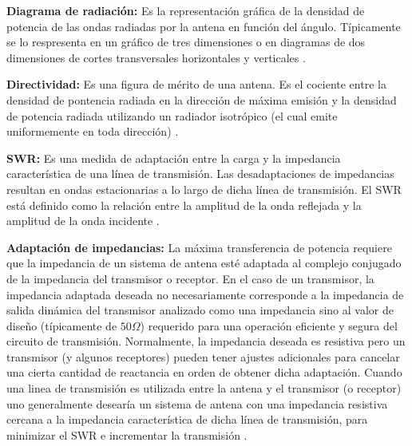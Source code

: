 {\textbf{Diagrama de radiación:}} Es la representación gráfica de la densidad de potencia de las ondas radiadas por la antena 
en función del ángulo. Típicamente se lo respresenta en un gráfico de tres dimensiones o en diagramas de dos dimensiones de 
cortes transversales horizontales y verticales \cite{AntennaWiki}.

{\textbf{Directividad:}} Es una figura de mérito de una antena. Es el cociente entre la densidad de pontencia radiada en la 
dirección de máxima emisión y la densidad de potencia radiada utilizando un radiador isotrópico (el cual emite uniformemente
en toda dirección) \cite{DirectivityWiki}.

{\textbf{SWR:}} Es una medida de adaptación entre la carga y la impedancia característica de una línea de transmisión. Las 
desadaptaciones de impedancias resultan en ondas estacionarias a lo largo de dicha línea de transmisión. El SWR está 
definido como la relación entre la amplitud de la onda reflejada y la amplitud de la onda incidente \cite{swrWiki}. 

{\textbf{Adaptación de impedancias:}} La máxima transferencia de potencia requiere que la impedancia de un sistema de 
antena esté adaptada al complejo conjugado de la impedancia del transmisor o receptor. En el caso de un transmisor, 
la impedancia adaptada deseada no necesariamente corresponde a la impedancia de salida dinámica del transmisor analizado
como una impedancia sino al valor de diseño (típicamente de $50 \Omega$) requerido para una operación eficiente
y segura del circuito de transmisión. Normalmente, la impedancia deseada es resistiva pero un transmisor (y algunos receptores)
pueden tener ajustes adicionales para cancelar una cierta cantidad de reactancia en orden de obtener dicha adaptación. Cuando
una linea de transmisión es utilizada entre la antena y el transmisor (o receptor) uno generalmente desearía un sistema de antena
con una impedancia resistiva cercana a la impedancia característica de dicha línea de transmisión, para minimizar el SWR 
e incrementar la transmisión \cite{AntennaWiki}. 

